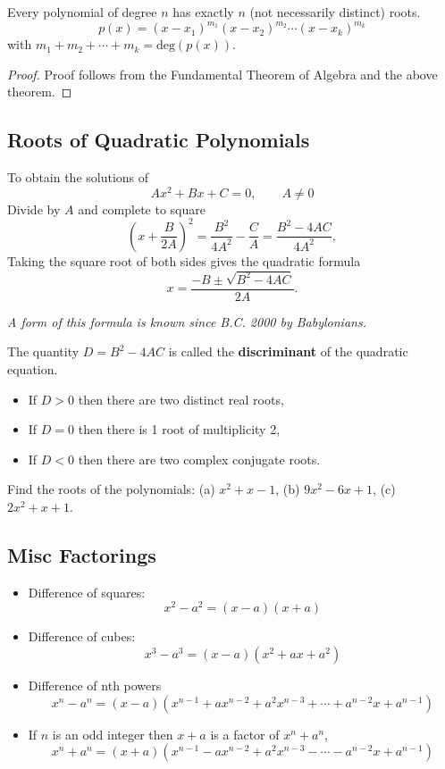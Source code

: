 \documentclass[calc1-main.tex]{subfiles}
\begin{document}
\begin{theorem}
  Every polynomial of degree $n$ has exactly $n$ (not necessarily distinct) roots.
  \[
    p(x) = (x-x_1)^{m_1}(x-x_2)^{m_2}\cdots(x-x_k)^{m_k}
  \]
  with $m_1 + m_2 + \cdots + m_k = \text{deg}(p(x))$.
\end{theorem}
\begin{proof}
  Proof follows from the Fundamental Theorem of Algebra and the above theorem.
\end{proof}
\subsection*{Roots of Quadratic Polynomials}
To obtain the solutions of
\[
  A x^2 + B x + C = 0, \qquad A \neq 0
\]
Divide by $A$ and complete to square
\[
  \left(x + \frac{B}{2A}\right)^2 = \frac{B^2}{4A^2} - \frac{C}{A} = \frac{B^2-4AC}{4A^2},
\]
Taking the square root of both sides gives the quadratic formula
\[
  x = \frac{-B \pm \sqrt{B^2 - 4AC}}{2A}.
\]

\textit{A form of this formula is known since B.C. 2000 by Babylonians.}

The quantity $D=B^2 - 4AC$ is called the \textbf{discriminant} of the quadratic equation.

\begin{itemize}
  \item If $D>0$ then there are two distinct real roots,
  \item If $D=0$ then there is 1 root of multiplicity 2,
  \item If $D<0$ then there are two complex conjugate roots.
\end{itemize}

\begin{example}
  Find the roots of the polynomials: (a) $x^2+x-1$, (b) $9x^2 -6x+1$, (c) $2x^2+x+1$.
\end{example}

\subsection*{Misc Factorings}

\begin{itemize}
  \item Difference of squares:
  \[
    x^2 - a^2 = (x-a)(x+a)
  \]
  \item Difference of cubes:
  \[
    x^3 - a^3 = (x-a)(x^2+ax+a^2)
  \]
  \item Difference of nth powers
  \[
    x^n - a^n = (x-a)(x^{n-1}+ a x^{n-2} + a^2 x^{n-3} + \cdots + a^{n-2}x + a^{n-1})
  \]
  \item If $n$ is an odd integer then $x+a$ is a factor of $x^n+a^n$,
  \[
    x^n + a^n = (x+a)(x^{n-1} - a x^{n-2} + a^2 x^{n-3} - \cdots - a^{n-2}x + a^{n-1})
  \]
\end{itemize}
\end{document}
